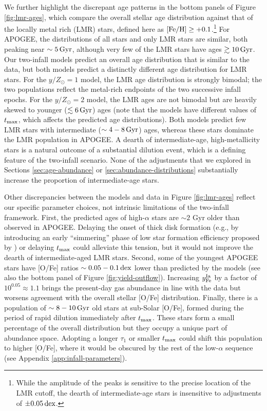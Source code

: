 \documentclass[twocolumn,twocolappendix]{aastex701}
\newcommand{\mathFeH}{{\rm [Fe/H]}}
\newcommand{\yZ}[1]{$y/Z_\odot=#1$}
\newcommand{\Gyr}{\,{\rm Gyr}}
\newcommand{\dex}{\,{\rm dex}}
\begin{document}
We further highlight the discrepant age patterns in the bottom panels of Figure \ref{fig:lmr-ages}, which compare the overall stellar age distribution against that of the locally metal rich (LMR) stars, defined here as $\mathFeH\ge+0.1$.\footnote{
    While the amplitude of the peaks is sensitive to the precise location of the LMR cutoff, the dearth of intermediate-age stars is insensitive to adjustments of $\pm0.05\dex$.
} For APOGEE, the distributions of all stars and only LMR stars are similar, both peaking near $\sim5\Gyr$, although very few of the LMR stars have ages $\gtrsim10\Gyr$. Our two-infall models predict an overall age distribution that is similar to the data, but both models predict a distinctly different age distribution for LMR stars. For the \yZ{1} model, the LMR age distribution is strongly bimodal; the two populations reflect the metal-rich endpoints of the two successive infall epochs. For the \yZ{2} model, the LMR ages are not bimodal but are heavily skewed to younger ($\lesssim6\Gyr$) ages (note that the models have different values of $t_{\rm max}$, which affects the predicted age distributions). Both models predict few LMR stars with intermediate ($\sim4-8\Gyr$) ages, whereas these stars dominate the LMR population in APOGEE. A dearth of intermediate-age, high-metallicity stars is a natural outcome of a substantial dilution event, which is a defining feature of the two-infall scenario. None of the adjustments that we explored in Sections \ref{sec:age-abundance} or \ref{sec:abundance-distributions} substantially increase the proportion of intermediate-age stars.

Other discrepancies between the models and data in Figure \ref{fig:lmr-ages} reflect our specific parameter choices, not intrinsic limitations of the two-infall framework. First, the predicted ages of high-$\alpha$ stars are $\sim2$ Gyr older than observed in APOGEE. Delaying the onset of thick disk formation (e.g., by introducing an early ``simmering'' phase of low star formation efficiency proposed by \citealt{conroy_birth_2022}) or delaying $t_{\rm max}$ could alleviate this tension, but it would not improve the dearth of intermediate-aged LMR stars. Second, some of the youngest APOGEE stars have [O/Fe] ratios $\sim0.05-0.1\dex$ lower than predicted by the models (see also the bottom panel of Figure \ref{fig:yield-outflow}). Increasing $y_{\rm Fe}^{\rm Ia}$ by a factor of $10^{0.05}\approx1.1$ brings the present-day gas abundance in line with the data but worsens agreement with the overall stellar [O/Fe] distribution. Finally, there is a population of $\sim8-10\Gyr$ old stars at sub-Solar [O/Fe], formed during the period of rapid dilution immediately after $t_{\rm max}$. These stars form a small percentage of the overall distribution \citep[Figure \ref{fig:ofe-feh-best}; see also Figure 11 from][]{spitoni_remind_2024} but they occupy a unique part of abundance space. Adopting a longer $\tau_1$ or smaller $t_{\rm max}$ could shift this population to higher [O/Fe], where it would be obscured by the rest of the low-$\alpha$ sequence (see Appendix \ref{app:infall-parameters}).
\end{document}

